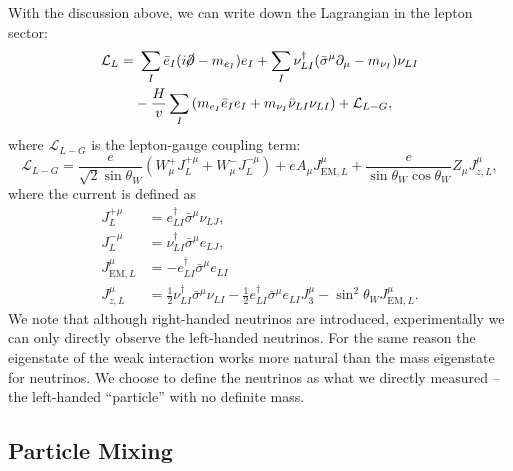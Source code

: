 With the discussion above, we can write down the Lagrangian in the lepton sector:
\begin{equation}
\begin{aligned}
	\mathcal L_L =&\ \sum_I \bar e_I (i\cancel\partial-m_{e_I})e_I + \sum_I \nu_{LI}^\dagger (\bar\sigma^\mu \partial_\mu -m_{\nu_I})\nu_{LI} \\
	& -\frac{H}{v} \sum_I \left(m_{e_I} \bar e_I e_I + m_{\nu_I}\bar\nu_{LI}\nu_{LI}\right)+ \mathcal L_{L-G},
\end{aligned}
\end{equation}
where $\mathcal L_{L-G}$ is the lepton-gauge coupling term:
\begin{equation}
	\mathcal L_{L-G} = \frac{e}{\sqrt{2}\sin{\theta_W}}\left(W^{+}_\mu J_L^{+\mu} + W^{-}_\mu J_L^{-\mu} \right) + e A_\mu J^{\mu}_{\mathrm{EM},L} + \frac{e}{\sin{\theta_W}\cos{\theta_W}} Z_\mu J^\mu_{z,L},
\end{equation}
where the current is defined as 
\begin{equation}
\begin{aligned}
	J^{+\mu}_L &= e_{LI}^\dagger \bar\sigma^\mu \nu_{LJ}, \\
	J^{-\mu}_L &= \nu_{LI}^\dagger \bar\sigma^\mu e_{LJ}, \\
	J^\mu_{\mathrm{EM},L} &= - e_{LI}^\dagger \bar\sigma^\mu e_{LI} \\
	J_{z,L}^\mu &= \frac{1}{2} \nu_{LI}^\dagger \bar\sigma^\mu \nu_{LI} - \frac{1}{2} e_{LI}^\dagger \bar\sigma^\mu e_{LI} J^\mu_3-\sin^2{\theta_W}J_{\mathrm{EM},L}^\mu.
\end{aligned}
\end{equation}
We note that although right-handed neutrinos are introduced, experimentally we can only directly observe the left-handed neutrinos.
For the same reason the eigenstate of the weak interaction works more natural than the mass eigenstate for neutrinos. 
We choose to define the neutrinos as what we directly measured -- the left-handed ``particle'' with no definite mass.



\subsection{Particle Mixing}

